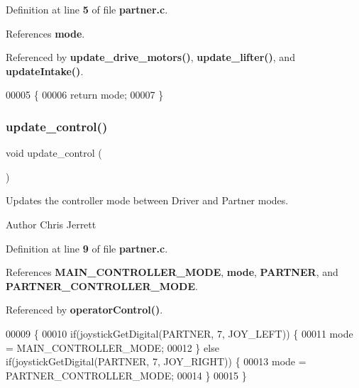 Definition at line \textbf{ 5} of file \textbf{ partner.\+c}.



References \textbf{ mode}.



Referenced by \textbf{ update\+\_\+drive\+\_\+motors()}, \textbf{ update\+\_\+lifter()}, and \textbf{ update\+Intake()}.


\begin{DoxyCode}
00005                               \{
00006   \textcolor{keywordflow}{return} mode;
00007 \}
\end{DoxyCode}
\mbox{\label{partner_8h_ab2c78903a76d2ed8969271803c78368a}} 
\subsubsection{update\+\_\+control()}
{\footnotesize\ttfamily void update\+\_\+control (\begin{DoxyParamCaption}{ }\end{DoxyParamCaption})}



Updates the controller mode between Driver and Partner modes. 

\begin{DoxyAuthor}{Author}
Chris Jerrett 
\end{DoxyAuthor}


Definition at line \textbf{ 9} of file \textbf{ partner.\+c}.



References \textbf{ M\+A\+I\+N\+\_\+\+C\+O\+N\+T\+R\+O\+L\+L\+E\+R\+\_\+\+M\+O\+DE}, \textbf{ mode}, \textbf{ P\+A\+R\+T\+N\+ER}, and \textbf{ P\+A\+R\+T\+N\+E\+R\+\_\+\+C\+O\+N\+T\+R\+O\+L\+L\+E\+R\+\_\+\+M\+O\+DE}.



Referenced by \textbf{ operator\+Control()}.


\begin{DoxyCode}
00009                       \{
00010   \textcolor{keywordflow}{if}(joystickGetDigital(PARTNER, 7, JOY\_LEFT)) \{
00011     mode = MAIN_CONTROLLER_MODE;
00012   \} \textcolor{keywordflow}{else} \textcolor{keywordflow}{if}(joystickGetDigital(PARTNER, 7, JOY\_RIGHT)) \{
00013     mode = PARTNER_CONTROLLER_MODE;
00014   \}
00015 \}
\end{DoxyCode}
